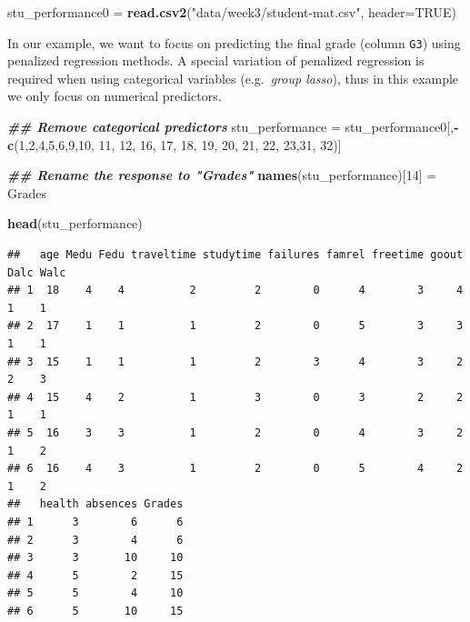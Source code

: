 \documentclass[
]{book}
\newenvironment{Shaded}{\begin{snugshade}}{\end{snugshade}}
\newcommand{\AttributeTok}[1]{\textcolor[rgb]{0.13,0.29,0.53}{#1}}
\newcommand{\ConstantTok}[1]{\textcolor[rgb]{0.56,0.35,0.01}{#1}}
\newcommand{\DecValTok}[1]{\textcolor[rgb]{0.00,0.00,0.81}{#1}}
\newcommand{\DocumentationTok}[1]{\textcolor[rgb]{0.56,0.35,0.01}{\textbf{\textit{#1}}}}
\newcommand{\FunctionTok}[1]{\textcolor[rgb]{0.13,0.29,0.53}{\textbf{#1}}}
\newcommand{\NormalTok}[1]{#1}
\newcommand{\OtherTok}[1]{\textcolor[rgb]{0.56,0.35,0.01}{#1}}
\newcommand{\SpecialCharTok}[1]{\textcolor[rgb]{0.81,0.36,0.00}{\textbf{#1}}}
\newcommand{\StringTok}[1]{\textcolor[rgb]{0.31,0.60,0.02}{#1}}
\begin{document}
\begin{Shaded}
\begin{Highlighting}[]
\NormalTok{stu\_performance0 }\OtherTok{=} \FunctionTok{read.csv2}\NormalTok{(}\StringTok{"data/week3/student{-}mat.csv"}\NormalTok{, }\AttributeTok{header=}\ConstantTok{TRUE}\NormalTok{)}
\end{Highlighting}
\end{Shaded}

In our example, we want to focus on predicting the final grade (column \texttt{G3}) using penalized regression methods. A special variation of penalized regression is required when using categorical variables (e.g.~\emph{group lasso}), thus in this example we only focus on numerical predictors.

\begin{Shaded}
\begin{Highlighting}[]
\DocumentationTok{\#\# Remove categorical predictors}
\NormalTok{stu\_performance }\OtherTok{=}\NormalTok{ stu\_performance0[,}\SpecialCharTok{{-}}\FunctionTok{c}\NormalTok{(}\DecValTok{1}\NormalTok{,}\DecValTok{2}\NormalTok{,}\DecValTok{4}\NormalTok{,}\DecValTok{5}\NormalTok{,}\DecValTok{6}\NormalTok{,}\DecValTok{9}\NormalTok{,}\DecValTok{10}\NormalTok{, }\DecValTok{11}\NormalTok{, }\DecValTok{12}\NormalTok{, }\DecValTok{16}\NormalTok{, }\DecValTok{17}\NormalTok{, }\DecValTok{18}\NormalTok{, }\DecValTok{19}\NormalTok{, }\DecValTok{20}\NormalTok{, }\DecValTok{21}\NormalTok{, }\DecValTok{22}\NormalTok{, }\DecValTok{23}\NormalTok{,}\DecValTok{31}\NormalTok{, }\DecValTok{32}\NormalTok{)]}

\DocumentationTok{\#\# Rename the response to "Grades"}
\FunctionTok{names}\NormalTok{(stu\_performance)[}\DecValTok{14}\NormalTok{] }\OtherTok{=} \StringTok{\textquotesingle{}Grades\textquotesingle{}}

\FunctionTok{head}\NormalTok{(stu\_performance)}
\end{Highlighting}
\end{Shaded}

\begin{verbatim}
##   age Medu Fedu traveltime studytime failures famrel freetime goout Dalc Walc
## 1  18    4    4          2         2        0      4        3     4    1    1
## 2  17    1    1          1         2        0      5        3     3    1    1
## 3  15    1    1          1         2        3      4        3     2    2    3
## 4  15    4    2          1         3        0      3        2     2    1    1
## 5  16    3    3          1         2        0      4        3     2    1    2
## 6  16    4    3          1         2        0      5        4     2    1    2
##   health absences Grades
## 1      3        6      6
## 2      3        4      6
## 3      3       10     10
## 4      5        2     15
## 5      5        4     10
## 6      5       10     15
\end{verbatim}
\end{document}
